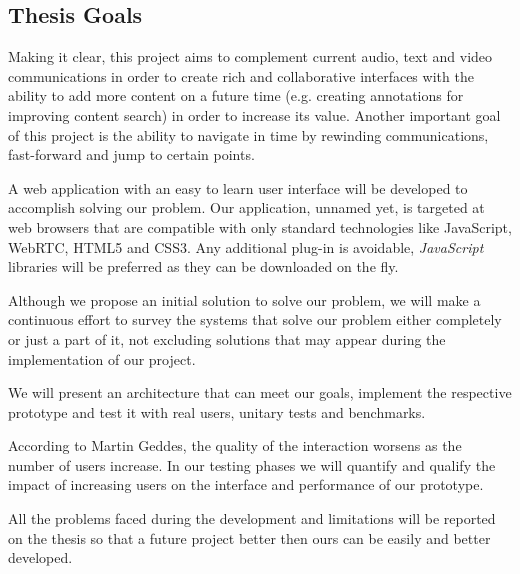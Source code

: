 \subsection{Thesis Goals} %

	Making it clear, this project aims to complement current audio, text and video communications in order to create rich and collaborative interfaces with the ability to add more content on a future time (e.g. creating annotations for improving content search) in order to increase its value. Another important goal of this project is the ability to navigate in time by rewinding communications, fast-forward and jump to certain points.

A web application with an easy to learn user interface will be developed to accomplish solving our problem. Our application, unnamed yet, is targeted at web browsers that are compatible with only standard technologies like JavaScript, \ac{WebRTC}, \ac{HTML}5 and \ac{CSS}3. Any additional plug-in is avoidable, \emph{JavaScript} libraries will be preferred as they can be downloaded on the fly.  


Although we propose an initial solution to solve our problem, we will make a continuous effort to survey the systems that solve our problem either completely or just a part of it, not excluding solutions that may appear during the implementation of our project.

We will present an architecture that can meet our goals, implement the respective prototype and test it with real users, unitary tests and benchmarks.

According to Martin Geddes, the quality of the interaction worsens as the number of users increase\cite{geddes}. In our testing phases we will quantify and qualify the impact of increasing users on the interface and performance of our prototype. 

	All the problems faced during the development and limitations will be reported on the thesis so that a future project better then ours can be easily and better developed.
